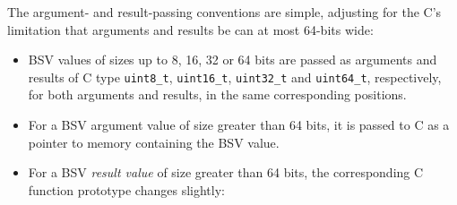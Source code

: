 \begin{center}
\end{center}

The argument- and result-passing conventions are simple, adjusting for
the C's limitation that arguments and results be can at most 64-bits
wide:

\begin{itemize}

 \item BSV values of sizes up to 8, 16, 32 or 64 bits are passed as
       arguments and results of C type \verb|uint8_t|,
       \verb|uint16_t|, \verb|uint32_t| and \verb|uint64_t|,
       respectively, for both arguments and results, in the same
       corresponding positions.

 \item For a BSV argument value of size greater than 64 bits, it is
       passed to C as a pointer to memory containing the BSV value.

 \item For a BSV \emph{result value} of size greater than 64 bits, the
       corresponding C function prototype changes slightly:

\end{itemize}


